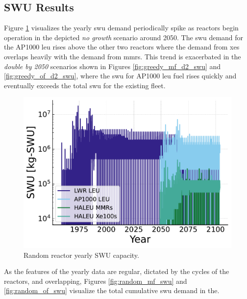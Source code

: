 \subsection{SWU Results}
\label{sec:random_swu}

Figure \ref{fig:swu_yearly_random} visualizes the yearly \gls{swu} demand periodically spike as reactors begin operation in the depicted \textit{no growth} scenario around 2050. The \gls{swu} demand for the AP1000 \gls{leu} rises above the other two reactors where the demand from \glspl{xe} overlaps heavily with the demand from \glspl{mmr}. This trend is exacerbated in the \textit{double by 2050} scenarios shown in Figures \ref{fig:greedy_mf_d2_swu} and \ref{fig:greedy_of_d2_swu}, where the \gls{swu} for AP1000 \gls{leu} fuel rises quickly and eventually exceeds the total \gls{swu} for the existing fleet.



\begin{figure}[H]
    \centering
    \includegraphics[scale=0.7]{images/results/swu/multi_drng_swu_by_fuel.pdf}
    \caption{Random reactor yearly SWU capacity.}
    \label{fig:swu_yearly_random}
\end{figure}

As the features of the yearly data are regular, dictated by the cycles of the
reactors, and overlapping, Figures \ref{fig:random_mf_swu} and \ref{fig:random_of_swu} visualize the total cumulative \gls{swu} demand in the.


